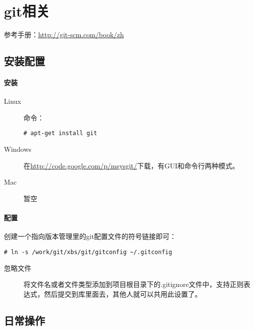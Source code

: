\section{git相关}

参考手册：\url{http://git-scm.com/book/zh}

\subsection{安装配置}
\label{sec:git-install-config}

\paragraph{安装}
\label{sec:git-install}

\begin{description}
\item[Linux] 命令：
\begin{lstlisting}[numbers=none]
# apt-get install git
\end{lstlisting}
\item[Windows] 在\url{http://code.google.com/p/msysgit/}下载，有GUI和命令行两种模式。
\item[Mac] 暂空
\end{description}

\paragraph{配置}
\label{sec:git-config}

创建一个指向版本管理里的git配置文件的符号链接即可：
\begin{lstlisting}[numbers=none]
# ln -s /work/git/xbs/git/gitconfig ~/.gitconfig
\end{lstlisting}

\begin{description}
\item[忽略文件] 将文件名或者文件类型添加到项目根目录下的.gitignore文件中，支持正则表达式，然后提交到库里面去，其他人就可以共用此设置了。
\end{description}



\subsection{日常操作}
\label{sec:git-usage}

